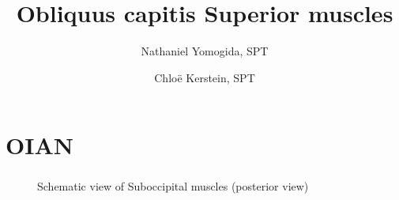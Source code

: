 \documentclass[
  letterpaper,
  DIV=11,
  numbers=noendperiod]{scrartcl}
\title{Obliquus capitis Superior muscles}
\author{Nathaniel Yomogida, SPT \and Chloë Kerstein, SPT}
\date{}
\renewcommand*\contentsname{Table of contents}
\newcommand\contentsname{Table of contents}
\begin{document}
\maketitle

\renewcommand*\contentsname{Table of contents}
{
\hypersetup{linkcolor=}
\setcounter{tocdepth}{3}
\tableofcontents
}
\section{OIAN}\label{oian}

\begin{figure}


\caption{\label{fig-suboccipitalmm36aagilroyAtlasAnatomy2020}Schematic
view of Suboccipital muscles (posterior
view)\textsuperscript{}}

\end{figure}%
\end{document}

